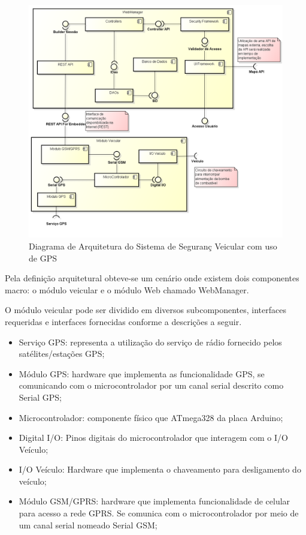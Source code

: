 \begin{figure}[!htb]
\centering
\includegraphics[width=\textwidth]{figures/4_arquitetural.png}
\caption{Diagrama de Arquitetura do Sistema de Seguran\c{c} Veicular com uso de GPS}
\label{fig:arquitetura}
\end{figure}


Pela definição arquitetural obteve-se um cenário onde existem dois componentes macro: o módulo veicular e o módulo Web chamado WebManager.

O módulo veicular pode ser dividido em diversos subcomponentes, interfaces requeridas e interfaces fornecidas conforme a descrições a seguir.

\begin{itemize}
	\item Serviço GPS: representa a utilização do serviço de rádio fornecido pelos satélites/estações GPS;
	\item Módulo GPS: hardware que implementa as funcionalidade GPS, se comunicando com o microcontrolador por um canal serial descrito como Serial GPS;
	\item Microcontrolador: componente físico que ATmega328 da placa Arduino;
	\item Digital I/O: Pinos digitais do microcontrolador que interagem com o I/O Veículo;
	\item I/O Veículo: Hardware que implementa o chaveamento para desligamento do veículo;
	\item Módulo GSM/GPRS: hardware que implementa funcionalidade de celular para acesso a rede GPRS. Se comunica com o microcontrolador por meio de um canal serial nomeado Serial GSM;
\end{itemize}

